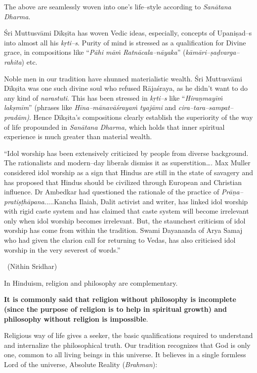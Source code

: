\vspace{-.4cm}

The above are seamlessly woven into one’s life–style according to \textit{Sanātana Dharma}.

Śri Muttusvāmi Dīkṣita has woven Vedic ideas, especially, concepts of Upaniṣad–s into almost all his \textit{kṛti–s}. Purity of mind is stressed as a qualification for Divine grace, in compositions like “\textit{Pāhi māṁ Ratnācala–nāyaka}” (\textit{kāmāri–ṣaḍvarga–rahita}) etc.

Noble men in our tradition have shunned materialistic wealth. Śri Muttusvāmi Dīkṣita was one such divine soul who refused Rājaśraya, as he didn’t want to do any kind of \textit{narastuti}. This has been stressed in \textit{kṛti–s} like “\textit{Hiraṇmayīṁ lakṣmīm}” (phrases like \textit{Hīna–mānavāśrayaṁ tyajāmi} and \textit{cira–tara–sampat–pradām)}. Hence Dīkṣita’s compositions clearly establish the superiority of the way of life propounded in \textit{Sanātana Dharma,} which holds that inner spiritual experience is much greater than material wealth.

\begin{myquote}
“Idol worship has been extensively criticized by people from diverse background. The rationalists and modern–day liberals dismiss it as superstition…. Max Muller considered idol worship as a sign that Hindus are still in the state of savagery and has proposed that Hindus should be civilized through European and Christian influence. Dr Ambedkar had questioned the rationale of the practice of \textit{Prāṇa–pratiṣṭhāpana}.....Kancha Ilaiah, Dalit activist and writer, has linked idol worship with rigid caste system and has claimed that caste system will become irrelevant only when idol worship becomes irrelevant. But, the staunchest criticism of idol worship has come from within the tradition. Swami Dayananda of Arya Samaj who had given the clarion call for returning to Vedas, has also criticised idol worship in the very severest of words.” 

~\hfill (Nithin Sridhar)
\end{myquote}

In Hinduism, religion and philosophy are complementary.

\textbf{It is commonly said that religion without philosophy is incomplete (since the purpose of religion is to help in spiritual growth) and philosophy without religion is impossible}.

Religious way of life gives a seeker, the basic qualifications required to understand and internalize the philosophical truth. Our tradition recognizes that God is only one, common to all living beings in this universe. It believes in a single formless Lord of the universe, Absolute Reality (\textit{Brahman}):

